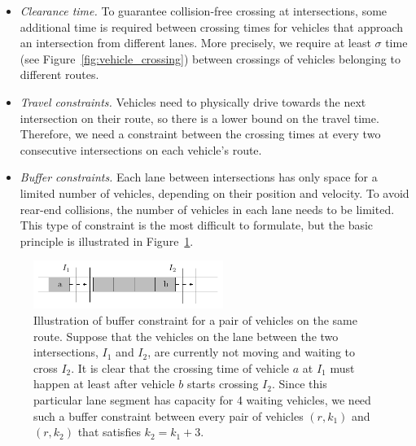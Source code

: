 \documentclass{article}
\theoremstyle{definition}
\theoremstyle{plain}
\begin{document}
\begin{itemize}
  \item \textit{Clearance time.} To guarantee collision-free crossing at
        intersections, some additional time is required between crossing times
        for vehicles that approach an intersection from different lanes. More
        precisely, we require at least $\sigma$ time (see
        Figure~\ref{fig:vehicle_crossing}) between crossings of vehicles
        belonging to different routes.

  \item \textit{Travel constraints.} Vehicles need to physically drive towards
        the next intersection on their route, so there is a lower bound on
        the travel time. Therefore, we need a constraint between the crossing
        times at every two consecutive intersections on each vehicle's route.

  \item \textit{Buffer constraints.} Each lane between intersections has only
        space for a limited number of vehicles, depending on their position and
        velocity. To avoid rear-end collisions, the number of vehicles in each
        lane needs to be limited.
        This type of constraint is the most difficult to formulate, but the basic
        principle is illustrated in
        Figure~\ref{fig:buffer_constraints}.
\end{itemize}

\begin{figure}[h]
  \centering
  \includegraphics[width=0.55\textwidth]{figures/buffer_constraints.pdf}
  \caption{Illustration of buffer constraint for a pair of vehicles on the same
    route. Suppose that the vehicles on the lane between the two intersections, $I_{1}$ and $I_{2}$,
    are currently not moving and waiting to cross $I_{2}$. It is clear that the
    crossing time of vehicle $a$ at $I_{1}$ must happen at least after
    vehicle $b$ starts crossing $I_{2}$. Since this particular lane segment has
    capacity for 4 waiting vehicles, we need such a buffer constraint between
    every pair of vehicles $(r,k_{1})$ and $(r,k_{2})$ that satisfies
    $k_{2} = k_{1} + 3$.}
  \label{fig:buffer_constraints}
  \end{figure}
\end{document}

